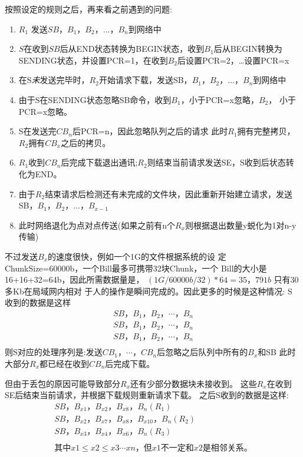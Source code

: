 按照设定的规则之后，再来看之前遇到的问题:
\begin{enumerate}
	\item $R_1$ 发送$SB$，$B_1，B_2，\ldots，B_n$到网络中
	\item $S$在收到$SB$后从END状态转换为BEGIN状态，收到$B_1$后从BEGIN转换为
		SENDING状态，并设置PCR=1，在收到$B_2$后设置PCR=2，\ldots 设置PCR=x
	\item 在S{\em 未}发送完毕时，$R_2$开始请求下载，发送SB，$B_1，B_2，\ldots，B_n$到网络中
	\item 由于S在SENDING状态忽略SB命令，收到$B_1$，小于PCR=x忽略，$B_2$，
		小于PCR=x忽略。
	\item S在发送完$CB_n$后PCR=n，因此忽略队列之后的请求
		此时$R_1$拥有完整拷贝，$R_2$拥有$CB_x$之后的拷贝。
	\item $R_1$收到$CB_n$后完成下载退出通讯;$R_2$则结束当前请求发送SE，S收到后状态转化为END。
	\item 由于$R_2$结束请求后检测还有未完成的文件块，因此重新开始建立请求，发送
		SB，$B_1，B_2，\ldots，B_{x-1}$
	\item 此时网络退化为点对点传送(如果之前有n个$R_x$则根据退出数量y蜕化为1对n-y传输)
\end{enumerate}

不过发送$B_x$的速度很快，例如一个1G的文件根据系统的设
定ChunkSize=60000b，一个Bill最多可携带32块Chunk，一个
Bill的大小是16+16+32=64b，因此所需数据量是，
$(1G/60000b/32)*64=35，791b$ 只有30多Kb在局域网内相对
于人的操作是瞬间完成的。因此更多的时候是这种情况: S
收到的数据是这样
\begin{align*}
	SB，B_1，B_2，\cdots，B_n\\
	SB，B_1，B_2，\cdots，B_n\\
	SB，B_1，B_2，\cdots，B_n\\
\end{align*}
则S对应的处理序列是:发送$CB_1，\cdots，CB_n$后忽略之后队列中所有的$B_x$和SB
此时大部分$R_x$都已经在收到$CB_n$后完成下载。

但由于丢包的原因可能导致部分$R_x$还有少部分数据块未接收到。
这些$R_x$在收到SE后结束当前请求，并根据下载规则重新请求下载。
之后S收到的数据是这样:
\begin{align*}
	SB，B_{x1}，B_{x2}，B_{x8}，B_n         	(R_1)\\
	SB，B_{x2}，B_{x7}，B_{x8}，B_{x10}，B_n 	(R_2)\\
	SB，B_{x3}，B_{x4}，B_{x6}，B_n 			(R_3)\\
	\\
	其中x1 \leq x2 \leq x3 \cdots xn，但x1不一定和x2是相邻关系。
\end{align*}

